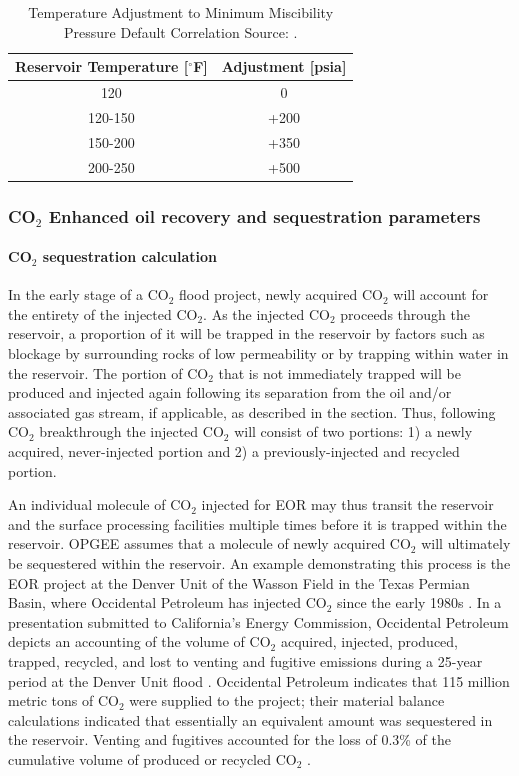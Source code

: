 \documentclass[11pt]{report}
\begin{document}
{\begin{table}
\begin{scriptsize}
\caption{Temperature Adjustment to Minimum Miscibility Pressure Default Correlation Source: \cite{NPC1976}.}
\label{tab:MMPCorrelationTempAdjust}
\begin{tabular}{cc}
Reservoir Temperature {[}$^{\circ}$F{]} & Adjustment {[}psia{]}\tabularnewline
\toprule
120 & 0\tabularnewline
120-150 & +200\tabularnewline
150-200 & +350\tabularnewline
200-250 & +500\tabularnewline
\bottomrule
\end{tabular}
\end{scriptsize}
\end{table}

\subsubsection{CO$_2$ Enhanced oil recovery and sequestration parameters}\label{sec:Sequestration}

\paragraph{CO$_2$ sequestration calculation} \label{par:IntroSeq}
In the early stage of a CO$_2$ flood project, newly acquired CO$_2$ will account for the entirety of the injected CO$_2$. As the injected CO$_2$ proceeds through the reservoir, a proportion of it will be trapped in the reservoir by factors such as blockage by surrounding rocks of low permeability or by trapping within water in the reservoir. The portion of CO$_2$ that is not immediately trapped will be produced and injected again following its separation from the oil and/or associated gas stream, if applicable, as described in the  section. Thus, following CO$_2$ breakthrough the injected CO$_2$ will consist of two portions: 1) a newly acquired, never-injected portion and 2) a previously-injected and recycled portion. 

An individual molecule of CO$_2$ injected for EOR may thus transit the reservoir and the surface processing facilities multiple times before it is trapped within the reservoir. OPGEE assumes that a molecule of newly acquired CO$_2$ will ultimately be sequestered within the reservoir. An example demonstrating this process is the EOR project at the Denver Unit of the Wasson Field in the Texas Permian Basin, where Occidental Petroleum has injected CO$_2$ since the early 1980s \cite{Oxy2015}. In a presentation submitted to California's Energy Commission, Occidental Petroleum depicts an accounting of the volume of CO$_2$ acquired, injected, produced, trapped, recycled, and lost to venting and fugitive emissions during a 25-year period at the Denver Unit flood \cite{Oxy2012}. Occidental Petroleum indicates that 115 million metric tons of CO$_2$ were supplied to the project; their material balance calculations indicated that essentially an equivalent amount was sequestered in the reservoir. Venting and fugitives accounted for the loss of 0.3\% of the cumulative volume of produced or recycled CO$_2$ \cite{Oxy2012}. 

}
\end{document}
